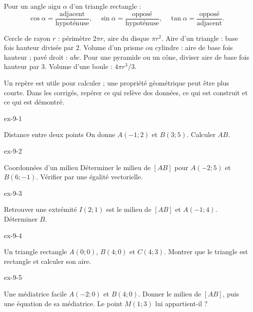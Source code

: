 \begin{propriete}Pour un angle aigu $\alpha$ d’un triangle rectangle :
\[\cos\alpha=\frac{\text{adjacent}}{\text{hypoténuse}},\quad
\sin\alpha=\frac{\text{opposé}}{\text{hypoténuse}},\quad
\tan\alpha=\frac{\text{opposé}}{\text{adjacent}}.\]
\end{propriete}
\begin{propriete}Cercle de rayon $r$ : périmètre $2\pi r$, aire du disque $\pi r^2$. Aire d’un triangle : base fois hauteur divisée par 2. Volume d’un prisme ou cylindre : aire de base fois hauteur ; pavé droit : $abc$. Pour une pyramide ou un cône, diviser aire de base fois hauteur par 3. Volume d’une boule : $4\pi r^3/3$.\end{propriete}
Un repère est utile pour calculer ; une propriété géométrique peut être plus courte. Dans les corrigés, repérer ce qui relève des données, ce qui est construit et ce qui est démontré.
\clearpage{}
\begin{blocLivre}{ex-9-1}
\begin{exercice}[1]{Distance entre deux points}
On donne $A(-1;2)$ et $B(3;5)$. Calculer $AB$.
\label{fig-ex-9-1}
\end{exercice}
\end{blocLivre}
\begin{blocLivre}{ex-9-2}
\begin{exercice}[1]{Coordonnées d’un milieu}
Déterminer le milieu de $[AB]$ pour $A(-2;5)$ et $B(6;-1)$. Vérifier par une égalité vectorielle.
\label{fig-ex-9-2}
\end{exercice}
\end{blocLivre}
\begin{blocLivre}{ex-9-3}
\begin{exercice}[1]{Retrouver une extrémité}
$I(2;1)$ est le milieu de $[AB]$ et $A(-1;4)$. Déterminer $B$.
\label{fig-ex-9-3}
\end{exercice}
\end{blocLivre}
\begin{blocLivre}{ex-9-4}
\begin{exercice}[1]{Un triangle rectangle}
$A(0;0)$, $B(4;0)$ et $C(4;3)$. Montrer que le triangle est rectangle et calculer son aire.
\label{fig-ex-9-4}
\end{exercice}
\end{blocLivre}
\begin{blocLivre}{ex-9-5}
\begin{exercice}[1]{Une médiatrice facile}
$A(-2;0)$ et $B(4;0)$. Donner le milieu de $[AB]$, puis une équation de sa médiatrice. Le point $M(1;3)$ lui appartient-il ?
\label{fig-ex-9-5}
\end{exercice}
\end{blocLivre}

